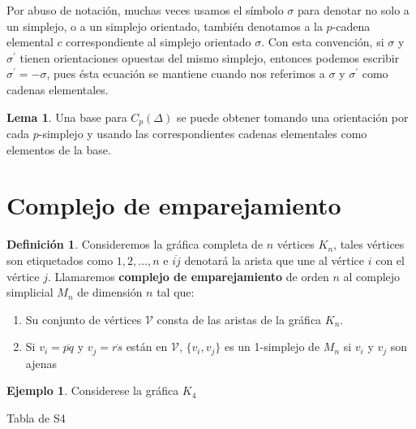 \documentclass[12pt]{book}
\theoremstyle{definition}
\newtheorem{definition}[theorem]{Definición}
\newtheorem{example}[theorem]{Ejemplo}
\newtheorem{lemma}[theorem]{Lema}
\newcounter{in}
\newcounter{ini}
\begin{document}
{Por abuso de notación, muchas veces usamos el símbolo $\sigma$ para
denotar no solo a un simplejo, o a un simplejo orientado, también
denotamos a la $p$-cadena elemental $c$ correspondiente al simplejo
orientado $\sigma$. Con esta convención, si $\sigma$ y $\sigma^{'}$
tienen orientaciones opuestas del mismo simplejo, entonces podemos
escribir $\sigma^{'}=-\sigma$, pues ésta ecuación se mantiene cuando
nos referimos a $\sigma$ y $\sigma^{'}$ como cadenas elementales.

\begin{lemma}
   Una base para $C_{p}(\Delta)$ se puede obtener
   tomando una orientación por cada $p$-simplejo y usando las
   correspondientes cadenas elementales como elementos de la base.
\end{lemma}


\section{Complejo de emparejamiento}

\begin{definition}
Consideremos la gráfica completa de $n$ vértices $K_{n}$, tales
vértices son etiquetados como $1,2,\ldots,n$ e
$\overline{ij}$ denotará la arista que une al vértice $i$ con el
vértice $j$. Llamaremos \textbf{complejo de emparejamiento} de orden
$n$ al complejo simplicial $M_{n}$ de dimensión $n$ tal que:

\begin{enumerate}
  \item Su conjunto de vértices $\mathcal{V}$ consta de las aristas de la gráfica
  $K_{n}$. 
  \item Si $v_{i}=\overline{pq}$ y $v_{j}=\overline{rs}$ están en
  $\mathcal{V}$, $\{v_{i},v_{j}\}$ es  un 1-simplejo de $M_{n}$ si $v_{i}$
  y $v_{j}$ son ajenas
\end{enumerate} 
\end{definition}

\begin{example}
Considerese la gráfica $K_{4}$
\end{example}


\bigskip
\bigskip
\bigskip
\bigskip
\bigskip
\bigskip
\bigskip
\bigskip
\bigskip
\bigskip

\begin{center}
Tabla de S4


\end{center}}
\end{document}
